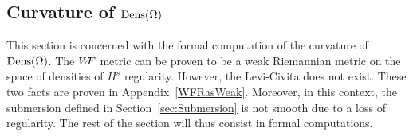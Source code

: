 %
%
%
%
%
%

\subsection[Curvature of Dens(Omega)]{Curvature of $\operatorname{Dens}(\Omega)$}
This section is concerned with the formal computation of the curvature of $\operatorname{Dens}(\Omega)$.
The $W\! \! F$ metric can be proven to be a weak Riemannian metric on the space of densities of $H^s$ regularity. However, the Levi-Civita does not exist. These two facts are proven in Appendix~\ref{WFRasWeak}.
Moreover, in this context, the submersion defined in Section~\ref{sec:Submersion} is not smooth due to a loss of regularity. The rest of the section will thus consist in formal computations.

